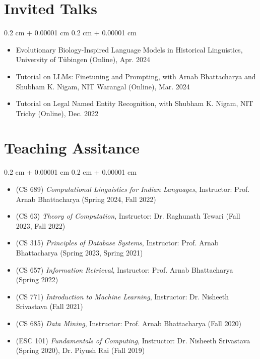 \documentclass[12pt, letterpaper]{article}
\newenvironment{highlightsforbulletentries}{
    \begin{itemize}[
        topsep=0.10 cm,
        parsep=0.10 cm,
        partopsep=0pt,
        itemsep=0pt,
        leftmargin=10pt
    ]
}{
    \end{itemize}
} %
\newenvironment{onecolentry}{
    \begin{adjustwidth}{
        0.2 cm + 0.00001 cm
    }{
        0.2 cm + 0.00001 cm
    }
}{
    \end{adjustwidth}
} %
\begin{document}
    
    \section{Invited Talks}

    \begin{onecolentry}
        \begin{highlightsforbulletentries}


        \item Evolutionary Biology-Inspired Language Models in Historical Linguistics, University of Tübingen (Online), Apr. 2024

        \item Tutorial on LLMs: Finetuning and Prompting, with Arnab Bhattacharya and Shubham K. Nigam, NIT Warangal (Online), Mar. 2024

        \item Tutorial on Legal Named Entity Recognition, with Shubham K. Nigam, NIT Trichy (Online), Dec. 2022


        \end{highlightsforbulletentries}
    \end{onecolentry}

    \section{Teaching Assitance}

    \begin{onecolentry}
        \begin{highlightsforbulletentries}


        \item (CS 689) \textit{Computational Linguistics for Indian Languages}, Instructor: Prof. Arnab Bhattacharya (Spring 2024, Fall 2022)

        \item (CS 63) \textit{Theory of Computation}, Instructor: Dr. Raghunath Tewari (Fall 2023, Fall 2022)

        \item (CS 315) \textit{Principles of Database Systems}, Instructor: Prof. Arnab Bhattacharya (Spring 2023, Spring 2021)

        \item (CS 657) \textit{Information Retrieval}, Instructor: Prof. Arnab Bhattacharya (Spring 2022)

        \item (CS 771) \textit{Introduction to Machine Learning}, Instructor: Dr. Nisheeth Srivastava (Fall 2021)

        \item (CS 685) \textit{Data Mining}, Instructor: Prof. Arnab Bhattacharya (Fall 2020)

        \item (ESC 101) \textit{Fundamentals of Computing}, Instructor: Dr. Nisheeth Srivastava (Spring 2020), Dr. Piyush Rai (Fall 2019)


        \end{highlightsforbulletentries}
    \end{onecolentry}
\end{document}
